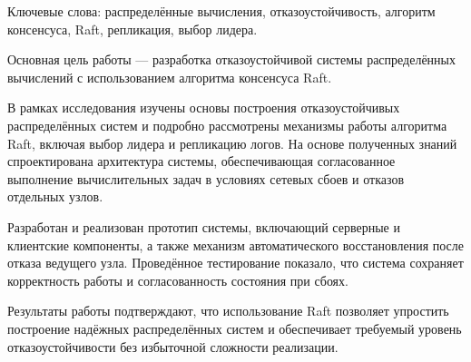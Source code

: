 \abstract %

Ключевые слова: распределённые вычисления, отказоустойчивость, алгоритм
консенсуса, Raft, репликация, выбор лидера.

Основная цель работы — разработка отказоустойчивой системы распределённых
вычислений с использованием алгоритма консенсуса Raft.

В рамках исследования изучены основы построения отказоустойчивых распределённых
систем и подробно рассмотрены механизмы работы алгоритма Raft, включая выбор
лидера и репликацию логов. На основе полученных знаний спроектирована
архитектура системы, обеспечивающая согласованное выполнение вычислительных
задач в условиях сетевых сбоев и отказов отдельных узлов.

Разработан и реализован прототип системы, включающий серверные и клиентские
компоненты, а также механизм автоматического восстановления после отказа
ведущего узла. Проведённое тестирование показало, что система сохраняет
корректность работы и согласованность состояния при сбоях.

Результаты работы подтверждают, что использование Raft позволяет упростить
построение надёжных распределённых систем и обеспечивает требуемый уровень
отказоустойчивости без избыточной сложности реализации.
